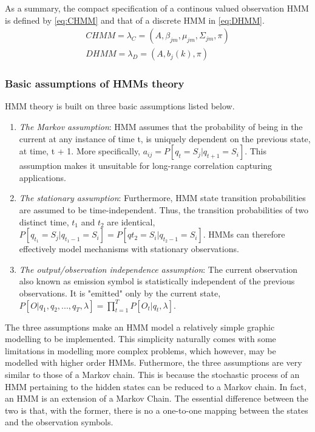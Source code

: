 As a summary, the compact specification of a continous valued observation HMM is defined by \ref{eq:CHMM} and that of a discrete HMM in \ref{eq:DHMM}.
\begin{align} 
	CHMM = \lambda_C = (A, \beta_{jm}, \mu_{jm}, \Sigma_{jm}, \pi) \label{eq:CHMM} \\
	DHMM = \lambda_D = (A, b_j(k), \pi) \label{eq:DHMM}
\end{align}

\subsubsection{Basic assumptions of HMMs theory}
HMM theory is built on three basic assumptions listed below.
\begin{enumerate}
\item \textit{The Markov assumption}: HMM assumes that the probability of being in the current	at any instance of time t, is uniquely dependent on the previous state, at time, t + 1. More specifically, \(a_{ij} = P[q_t = S_j|q_{t+1}=S_i]\). This assumption makes it unsuitable for long-range correlation capturing applications.
\item \textit{The stationary assumption}: Furthermore, HMM state transition probabilities are assumed to be time-independent. Thus, the transition probabilities of two distinct time, \(t_1\) and \(t_2\) are identical, \(P[q_{t_1} = S_j|q_{t_1 -1} = S_i] = P[q{t_2}=S_i|q_{t_2-1} = S_i]\). HMMs can therefore effectively model mechanisms with stationary observations.
\item \textit{The output/observation independence assumption}: The current observation also known as emission symbol is statistically independent of the previous observations. It is "emitted" only by the current state, \(P[O|q_1, q_2, ..., q_T, \lambda]=\prod_{t=1}^{T}P[O_t|q_t, \lambda]\).
\end{enumerate} 
The three assumptions make an HMM model a relatively simple graphic modelling to be implemented. This simplicity naturally comes with some limitations in modelling more complex problems, which however, may be modelled with higher order HMMs. %
Futhermore, the three assumptions are very similar to those of a Markov chain. This is because the stochastic process of an HMM pertaining to the hidden states can be reduced to a Markov chain. In fact, an HMM is an extension of a Markov Chain. The essential difference between the two is that, with the former, there is no a one-to-one mapping between the states and the observation symbols. %

